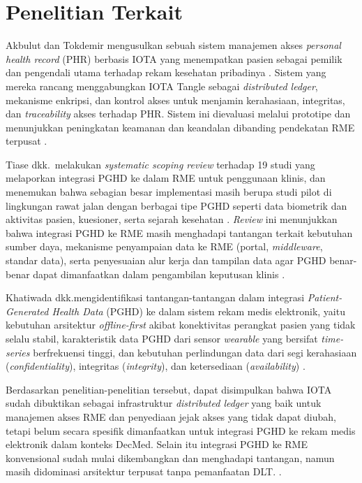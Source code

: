 \section{Penelitian Terkait}\label{studi-penelitian-terkait}

Akbulut dan Tokdemir mengusulkan sebuah sistem manajemen akses \textit{personal health record} (PHR) berbasis IOTA yang menempatkan pasien sebagai pemilik dan pengendali utama terhadap rekam kesehatan pribadinya \parencite{Akbulut_2020_iota_phr}. 
Sistem yang mereka rancang menggabungkan IOTA Tangle sebagai \textit{distributed ledger}, mekanisme enkripsi, dan kontrol akses untuk menjamin kerahasiaan, integritas, dan \textit{traceability} akses terhadap PHR\@.
Sistem ini dievaluasi melalui prototipe dan menunjukkan peningkatan keamanan dan keandalan dibanding pendekatan RME terpusat \parencite{Akbulut_2020_iota_phr}.

Tiase dkk.\ melakukan \textit{systematic scoping review} terhadap 19 studi yang melaporkan integrasi PGHD ke dalam RME untuk penggunaan klinis, dan menemukan bahwa sebagian besar implementasi masih berupa studi pilot di lingkungan rawat jalan dengan berbagai tipe PGHD seperti data biometrik dan aktivitas pasien, kuesioner, serta sejarah kesehatan \parencite{Tiase2020-PGHD_EHR_Integration}. 
\textit{Review} ini menunjukkan bahwa integrasi PGHD ke RME masih menghadapi tantangan terkait kebutuhan sumber daya, mekanisme penyampaian data ke RME (portal, \textit{middleware}, standar data), serta penyesuaian alur kerja dan tampilan data agar PGHD benar-benar dapat dimanfaatkan dalam pengambilan keputusan klinis \parencite{Tiase2020-PGHD_EHR_Integration}.

Khatiwada dkk.\@ mengidentifikasi tantangan-tantangan dalam integrasi \textit{Patient-Generated Health Data} (PGHD) ke dalam sistem rekam medis elektronik, yaitu kebutuhan arsitektur \textit{offline-first} akibat konektivitas perangkat pasien yang tidak selalu stabil, karakteristik data PGHD dari sensor \textit{wearable} yang bersifat \textit{time-series} berfrekuensi tinggi, dan kebutuhan perlindungan data dari segi kerahasiaan (\textit{confidentiality}), integritas (\textit{integrity}), dan ketersediaan (\textit{availability})
\parencite{Khatiwada_Yang_Lin_Blobel_2024_PGHD_Understanding}. 

Berdasarkan penelitian-penelitian tersebut, dapat disimpulkan bahwa IOTA sudah dibuktikan sebagai infrastruktur \textit{distributed ledger} yang baik untuk manajemen akses RME dan penyediaan jejak akses yang tidak dapat diubah, tetapi belum secara spesifik dimanfaatkan untuk integrasi PGHD ke rekam medis elektronik dalam konteks DecMed. 
Selain itu integrasi PGHD ke RME konvensional sudah mulai dikembangkan dan menghadapi tantangan, namun masih didominasi arsitektur terpusat tanpa pemanfaatan DLT\@. \parencite{Akbulut_2020_iota_phr,Tiase2020-PGHD_EHR_Integration}.


